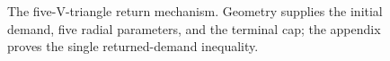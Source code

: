 \begin{figure}[H]
\centering
\resizebox{.99\linewidth}{!}{}
\caption{The five-V-triangle return mechanism.  Geometry supplies the initial
demand, five radial parameters, and the terminal cap; the appendix proves the
single returned-demand inequality.}
\label{fig:strategy2-five-V-triangle-skeleton}
\end{figure}
